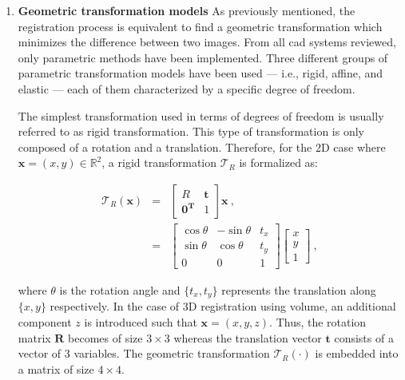 \begin{enumerate}[leftmargin=*]

\item[] \textbf{Geometric transformation models}
As previously mentioned, the registration process is equivalent to find a
geometric transformation which minimizes the difference between two images.
From all \ac{cad} systems reviewed, only parametric methods have been
implemented.
Three different groups of parametric transformation models have been used ---
i.e., rigid, affine, and elastic --- each of them characterized by a specific
degree of freedom.

The simplest transformation used in terms of degrees of freedom is usually
referred to as rigid transformation.
This type of transformation is only composed of a rotation and a translation.
Therefore, for the 2D case where $\mathbf{x} = (x,y) \in \mathbb{R}^2$, a rigid
transformation $\mathcal{T}_R$ is formalized as:

\begin{eqnarray}
  \mathcal{T}_R(\mathbf{x}) & = & \begin{bmatrix}
    R & \mathbf{t} \\
    \mathbf{0^T} & 1
  \end{bmatrix} \mathbf{x} \ , \nonumber \\
                            & = & \begin{bmatrix}
                              \cos \theta & -\sin \theta & t_x \\
                              \sin \theta & \cos \theta & t_y \\
                              0 & 0 & 1
                            \end{bmatrix}\begin{bmatrix}
                              x \\
                              y \\
                              1
                            \end{bmatrix} \ , \label{eq:rigtra} %
\end{eqnarray}

\noindent where $\theta$ is the rotation angle and $\{ t_x,t_y \}$ represents
the translation along $\{x,y\}$ respectively.
In the case of 3D registration using volume, an additional component $z$ is
introduced such that $\mathbf{x} = (x,y,z)$.
Thus, the rotation matrix $\mathbf{R}$ becomes of size $3 \times 3$ whereas the
translation vector $\mathbf{t}$ consists of a vector of 3 variables.
The geometric transformation $\mathcal{T}_R(\cdot)$ is embedded into a matrix
of size $4 \times 4$.


\end{enumerate}
